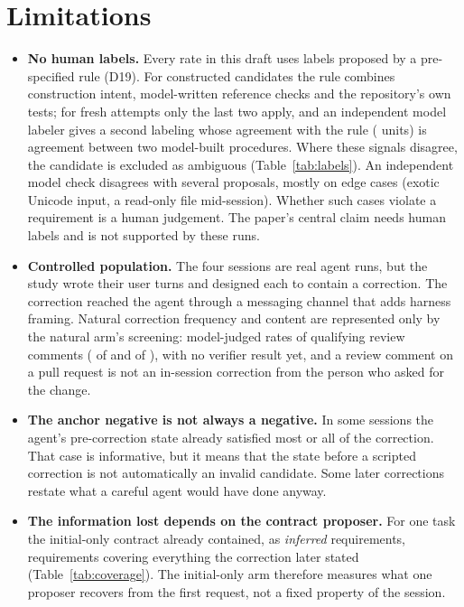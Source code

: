 \section{Limitations}
\label{sec:limitations}
\begin{itemize}
\item \textbf{No human labels.} Every rate in this draft uses labels proposed by a pre-specified rule (D19). For constructed candidates the rule combines construction intent, model-written reference checks and the repository's own tests; for fresh attempts only the last two apply, and an independent model labeler gives a second labeling whose agreement with the rule ( units) is agreement between two model-built procedures. Where these signals disagree, the candidate is excluded as ambiguous (Table~\ref{tab:labels}). An independent model check disagrees with several proposals, mostly on edge cases (exotic Unicode input, a read-only file mid-session). Whether such cases violate a requirement is a human judgement. The paper's central claim needs human labels and is not supported by these runs.
\item \textbf{Controlled population.} The four sessions are real agent runs, but the study wrote their user turns and designed each to contain a correction. The correction reached the agent through a messaging channel that adds harness framing. Natural correction frequency and content are represented only by the natural arm's screening: model-judged rates of qualifying review comments ( of  and  of ), with no verifier result yet, and a review comment on a pull request is not an in-session correction from the person who asked for the change.
\item \textbf{The anchor negative is not always a negative.} In some sessions the agent's pre-correction state already satisfied most or all of the correction. That case is informative, but it means that the state before a scripted correction is not automatically an invalid candidate. Some later corrections restate what a careful agent would have done anyway.
\item \textbf{The information lost depends on the contract proposer.} For one task the initial-only contract already contained, as \emph{inferred} requirements, requirements covering everything the correction later stated (Table~\ref{tab:coverage}). The initial-only arm therefore measures what one proposer recovers from the first request, not a fixed property of the session.

\end{itemize}
